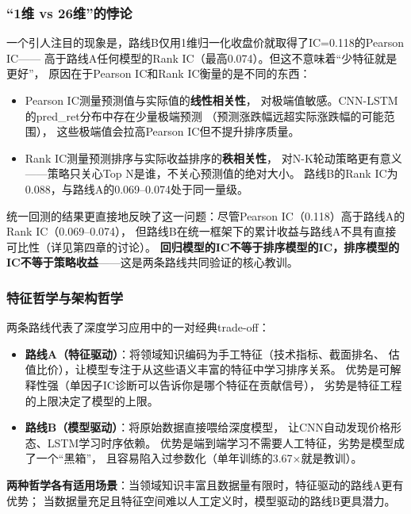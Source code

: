 \documentclass[12pt,a4paper]{ctexart}
\begin{document}
\subsubsection{“1维 vs 26维”的悖论}

一个引人注目的现象是，路线B仅用1维归一化收盘价就取得了IC=0.118的Pearson IC——
高于路线A任何模型的Rank IC（最高0.074）。但这不意味着“少特征就是更好”，
原因在于Pearson IC和Rank IC衡量的是不同的东西：

\begin{itemize}[leftmargin=*]
    \item Pearson IC测量预测值与实际值的\textbf{线性相关性}，
          对极端值敏感。CNN-LSTM的pred\_ret分布中存在少量极端预测
          （预测涨跌幅远超实际涨跌幅的可能范围），
          这些极端值会拉高Pearson IC但不提升排序质量。
    \item Rank IC测量预测排序与实际收益排序的\textbf{秩相关性}，
          对N-K轮动策略更有意义——策略只关心Top N是谁，不关心预测值的绝对大小。
          路线B的Rank IC为0.088，与路线A的0.069--0.074处于同一量级。
\end{itemize}

统一回测的结果更直接地反映了这一问题：尽管Pearson IC（0.118）高于路线A的Rank IC（0.069--0.074），
但路线B在统一框架下的累计收益与路线A不具有直接可比性（详见第四章的讨论）。
\textbf{回归模型的IC不等于排序模型的IC，排序模型的IC不等于策略收益}——这是两条路线共同验证的核心教训。

\subsubsection{特征哲学与架构哲学}

两条路线代表了深度学习应用中的一对经典trade-off：

\begin{itemize}[leftmargin=*]
    \item \textbf{路线A（特征驱动）}：将领域知识编码为手工特征（技术指标、截面排名、
          估值比价），让模型专注于从这些语义丰富的特征中学习排序关系。
          优势是可解释性强（单因子IC诊断可以告诉你是哪个特征在贡献信号），
          劣势是特征工程的上限决定了模型的上限。
    \item \textbf{路线B（模型驱动）}：将原始数据直接喂给深度模型，
          让CNN自动发现价格形态、LSTM学习时序依赖。
          优势是端到端学习不需要人工特征，劣势是模型成了一个“黑箱”，
          且容易陷入过参数化（单年训练的3.67$\times$就是教训）。
\end{itemize}

\textbf{两种哲学各有适用场景}：当领域知识丰富且数据量有限时，特征驱动的路线A更有优势；
当数据量充足且特征空间难以人工定义时，模型驱动的路线B更具潜力。
\end{document}
